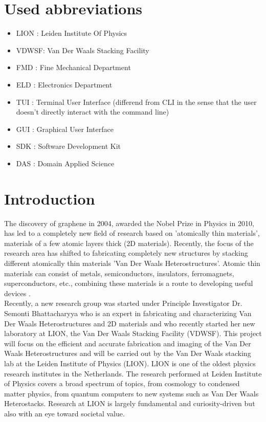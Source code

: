\documentclass[11pt]{article}
\begin{document}
\newpage

\tableofcontents
\newpage

\section*{Used abbreviations}
\label{ap:veel_gebruikte_symbolen}
\begin{itemize}[noitemsep]
    \item LION : Leiden Institute Of Physics
    \item VDWSF: Van Der Waals Stacking Facility
    \item FMD : Fine Mechanical Department
    \item ELD : Electronics Department
    \item TUI : Terminal User Interface (differend from CLI in the sense that the user doesn't directly interact with the command line)
    \item GUI : Graphical User Interface
    \item SDK : Software Development Kit
    \item DAS : Domain Applied Science

\end{itemize}

\clearpage

\section{Introduction}
The discovery of graphene in 2004, awarded the Nobel Prize in Physics in 2010, has led to a completely new field of research based on 'atomically thin materials', materials of a few atomic layers thick (2D materials). 
Recently, the focus of the research area has shifted to fabricating completely new structures by stacking different atomically thin materials 'Van Der Waals Heterostructures'. 
Atomic thin materials can consist of metals, semiconductors, insulators, ferromagnets, superconductors, etc., combining these materials is a route to developing useful devices \citep{geimVanWaalsHeterostructures2013}. \\

Recently, a new research group was started under Principle Investigator Dr. Semonti Bhattacharyya who is an expert in fabricating and characterizing Van Der Waals Heterostructures and 2D materials and who recently started her new laboratory at LION, the Van Der Waals Stacking Facility (VDWSF).
This project will focus on the efficient and accurate fabrication and imaging of the Van Der Waals Heterostructures and will be carried out by the Van Der Waals stacking lab at the Leiden Institute of Physics (LION). 
LION is one of the oldest physics research institutes in the Netherlands. 
The research performed at Leiden Institute of Physics covers a broad spectrum of topics, from cosmology to condensed matter physics, from quantum computers to new systems such as Van Der Waals Heterostacks.
Research at LION is largely fundamental and curiosity-driven but also with an eye toward societal value. \\
\end{document}
